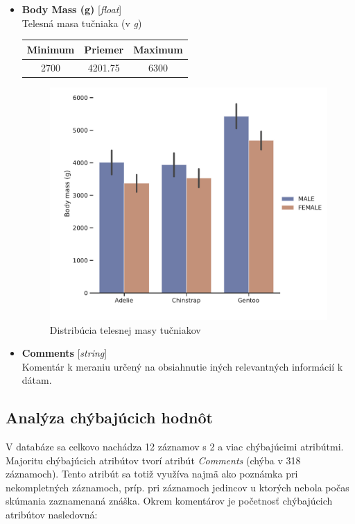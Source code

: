 \documentclass[a4paper, 16pt]{article}
\begin{document}
\begin{itemize}
    
    \item \textbf{Body Mass (g)} [\emph{float}]\\
    Telesná  masa tučniaka (v \emph{g})
    \begin{table}[H]
    \centering
    \begin{tabular}{|c|c|c|}
    \hline
    \textbf{Minimum} & \textbf{Priemer} & \textbf{Maximum} \\ \hline
                 2700         &       4201.75           &    6300                   \\ \hline
    \end{tabular}
    \end{table}
    
    \begin{figure}[H]
    \centering
    \includegraphics[width=15cm]{graphs/weight.pdf}
    \caption{Distribúcia telesnej masy tučniakov}
    \label{fig:4}
    \end{figure}
   
  
  
    
    \item\textbf{Comments} [\emph{string}]\\
    Komentár k meraniu určený na obsiahnutie iných relevantných informácií k dátam.

\end{itemize}
\newpage
\subsection{Analýza chýbajúcich hodnôt}
V databáze sa celkovo nachádza 12 záznamov s 2 a viac chýbajúcimi atribútmi. Majoritu chýbajúcich atribútov tvorí atribút \emph{Comments} (chýba v 318 záznamoch). Tento atribút sa totiž využíva najmä ako poznámka pri nekompletných záznamoch, príp. pri záznamoch jedincov u ktorých nebola počas skúmania zaznamenaná znáška. Okrem komentárov je početnosť chýbajúcich  atribútov nasledovná: 
\end{document}
